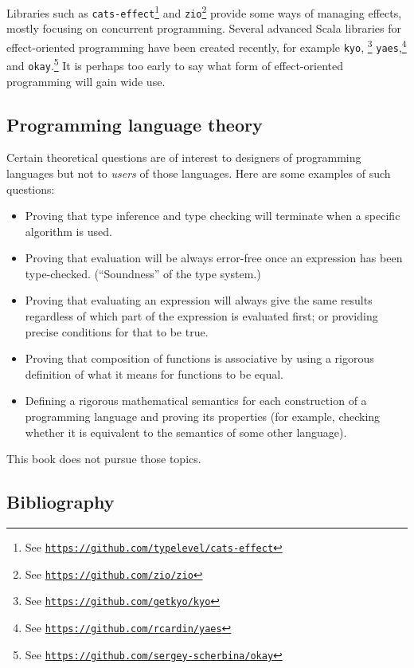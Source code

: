 Libraries such as \lstinline!cats-effect!\footnote{See \texttt{\href{https://github.com/typelevel/cats-effect}{https://github.com/typelevel/cats-effect}}}
and \lstinline!zio!\footnote{See \texttt{\href{https://github.com/zio/zio}{https://github.com/zio/zio}}}
provide some ways of managing effects, mostly focusing on concurrent
programming. Several advanced Scala libraries for effect-oriented
programming have been created recently, for example \lstinline!kyo!,
\footnote{See \texttt{\href{https://github.com/getkyo/kyo}{https://github.com/getkyo/kyo}}}
\lstinline!yaes!,\footnote{See \texttt{\href{https://github.com/rcardin/yaes}{https://github.com/rcardin/yaes}}}
and \lstinline!okay!.\footnote{See \texttt{\href{https://github.com/sergey-scherbina/okay}{https://github.com/sergey-scherbina/okay}}}
It is perhaps too early to say what form of effect-oriented programming
will gain wide use.

\subsection{Programming language theory}

Certain theoretical questions are of interest to designers of programming
languages but not to \emph{users} of those languages. Here are some
examples of such questions:
\begin{itemize}
\item Proving that type inference and type checking will terminate when
a specific algorithm is used.
\item Proving that evaluation will be always error-free once an expression
has been type-checked. (\textsf{``}Soundness\textsf{''} of the type system.)
\item Proving that evaluating an expression will always give the same results
regardless of which part of the expression is evaluated first; or
providing precise conditions for that to be true.
\item Proving that composition of functions is associative by using a rigorous
definition of what it means for functions to be equal.
\item Defining a rigorous mathematical semantics for each construction of
a programming language and proving its properties (for example, checking
whether it is equivalent to the semantics of some other language).
\end{itemize}
This book does not pursue those topics.

\subsection{Bibliography}

